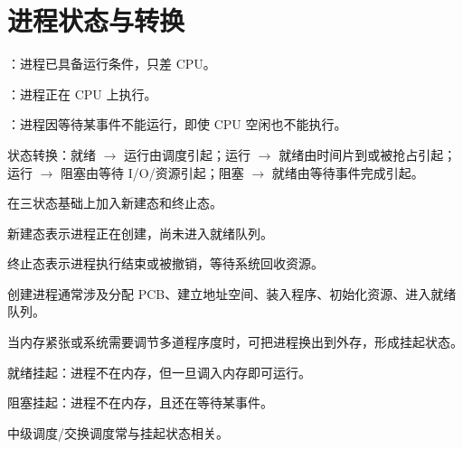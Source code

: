 \section{进程状态与转换}
\begin{points}
  \item {}：进程已具备运行条件，只差 CPU。
  \item {}：进程正在 CPU 上执行。
  \item {}：进程因等待某事件不能运行，即使 CPU 空闲也不能执行。
  \item 状态转换：就绪 $\rightarrow$ 运行由调度引起；运行 $\rightarrow$ 就绪由时间片到或被抢占引起；运行 $\rightarrow$ 阻塞由等待 I/O/资源引起；阻塞 $\rightarrow$ 就绪由等待事件完成引起。
\end{points}


\begin{points}
  \item 在三状态基础上加入新建态和终止态。
  \item 新建态表示进程正在创建，尚未进入就绪队列。
  \item 终止态表示进程执行结束或被撤销，等待系统回收资源。
  \item 创建进程通常涉及分配 PCB、建立地址空间、装入程序、初始化资源、进入就绪队列。
\end{points}


\begin{points}
  \item 当内存紧张或系统需要调节多道程序度时，可把进程换出到外存，形成挂起状态。
  \item 就绪挂起：进程不在内存，但一旦调入内存即可运行。
  \item 阻塞挂起：进程不在内存，且还在等待某事件。
  \item 中级调度/交换调度常与挂起状态相关。
\end{points}


